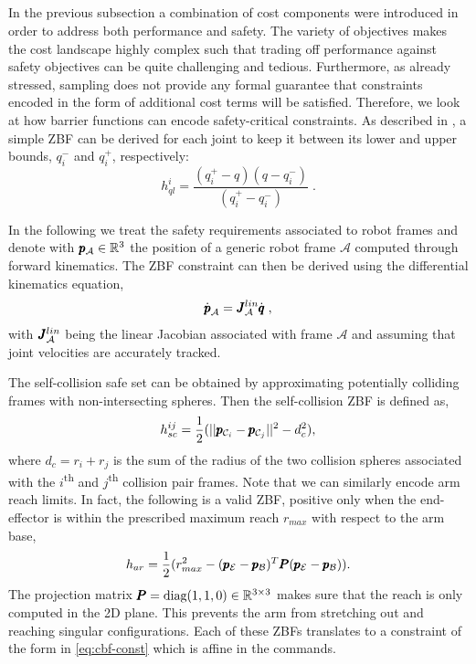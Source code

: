 \subsection{}
In the previous subsection a combination of cost components were introduced in order to address both performance and safety. The variety of objectives makes the cost landscape highly complex such that trading off performance against safety objectives can be quite challenging and tedious. Furthermore, as already stressed, sampling does not provide any formal guarantee that constraints encoded in the form of additional cost terms will be satisfied. Therefore, we look at how barrier functions can encode safety-critical constraints. As described in \cite{benzi2021optimization}, a simple ZBF can be derived for each joint to keep it between its lower and upper bounds, $q_i^-$ and $q_i^+$, respectively:
\begin{equation}
h_{ql}^i = \frac{(q_i^+ - q)(q - q_i^-)}{(q_i^+ - q_i^-)}\;.
\end{equation}

In the following we treat the safety requirements associated to robot frames and denote with $\pmb{p}_{\mathcal{A}} \in \mathbb{R}^{3}$ the position of a generic robot frame $\mathcal{A}$ computed through forward kinematics. The ZBF constraint can then be derived using the differential kinematics equation,
\begin{equation}
    \dot{\pmb{p}}_{\mathcal{A}} = \pmb{J}^{lin}_{\mathcal{A}} \dot{\pmb{q}}\;,
\end{equation}
with $\pmb{J}^{lin}_{\mathcal{A}}$ being the linear Jacobian associated with frame $\mathcal{A}$ and assuming that joint velocities are accurately tracked. 

The self-collision safe set can be obtained by approximating potentially colliding frames with non-intersecting spheres. Then the self-collision ZBF is defined as,
\begin{equation}
    h_{sc}^{ij} = \frac{1}{2}(||\pmb{p}_{\mathcal{C}_i} - \pmb{p}_{\mathcal{C}_j}||^2 - d_c^2),
\end{equation}
where $d_c = r_i + r_j$ is the sum of the radius of the two collision spheres associated with the $i$\textsuperscript{th}  and $j$\textsuperscript{th} collision pair frames. Note that we can similarly encode arm reach limits. In fact, the following is a valid ZBF, positive only when the end-effector is within the prescribed maximum reach $r_{max}$ with respect to the arm base,
\begin{equation}
    h_{ar} = \frac{1}{2}(r_{max}^2 - (\pmb{p}_{\mathcal{E}} - \pmb{p}_{\mathcal{B}})^T \pmb{P} (\pmb{p}_{\mathcal{E}} - \pmb{p}_{\mathcal{B}}) ).
\end{equation}
The projection matrix $\pmb{P} = \text{diag}(1, 1, 0) \in \mathbb{R}^{3 \times 3}$ makes sure that the reach is only computed in the 2D plane. This prevents the arm from stretching out and reaching singular configurations. Each of these ZBFs translates to a constraint of the form in \eqref{eq:cbf-const} which is affine in the commands. 

